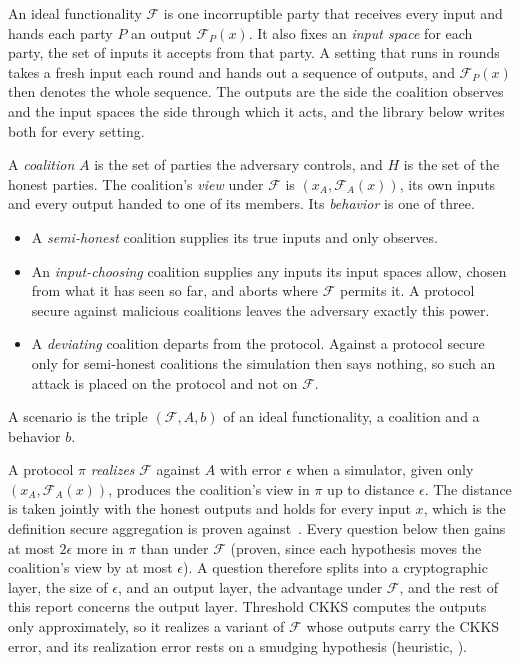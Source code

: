 \documentclass{labreport}
\newcommand{\IF}{\mathcal{F}}
\begin{document}
An ideal functionality $\IF$ is one incorruptible party that receives every input and hands each party $P$ an output $\IF_P(x)$.
It also fixes an \emph{input space} for each party, the set of inputs it accepts from that party.
A setting that runs in rounds takes a fresh input each round and hands out a sequence of outputs, and $\IF_P(x)$ then denotes the whole sequence.
The outputs are the side the coalition observes and the input spaces the side through which it acts, and the library below writes both for every setting.

A \emph{coalition} $A$ is the set of parties the adversary controls, and $H$ is the set of the honest parties.
The coalition's \emph{view} under $\IF$ is $(x_A,\IF_A(x))$, its own inputs and every output handed to one of its members.
Its \emph{behavior} is one of three.
\begin{itemize}
  \item A \emph{semi-honest} coalition supplies its true inputs and only observes.
  \item An \emph{input-choosing} coalition supplies any inputs its input spaces allow, chosen from what it has seen so far, and aborts where $\IF$ permits it. A protocol secure against malicious coalitions leaves the adversary exactly this power.
  \item A \emph{deviating} coalition departs from the protocol. Against a protocol secure only for semi-honest coalitions the simulation then says nothing, so such an attack is placed on the protocol and not on $\IF$.
\end{itemize}
A scenario is the triple $(\IF,A,b)$ of an ideal functionality, a coalition and a behavior $b$.

A protocol $\pi$ \emph{realizes} $\IF$ against $A$ with error $\epsilon$ when a simulator, given only $(x_A,\IF_A(x))$, produces the coalition's view in $\pi$ up to distance $\epsilon$.
The distance is taken jointly with the honest outputs and holds for every input $x$, which is the definition secure aggregation is proven against~\cite{MOJC23,MWAPR23}.
Every question below then gains at most $2\epsilon$ more in $\pi$ than under $\IF$ (proven, since each hypothesis moves the coalition's view by at most $\epsilon$).
A question therefore splits into a cryptographic layer, the size of $\epsilon$, and an output layer, the advantage under $\IF$, and the rest of this report concerns the output layer.
Threshold CKKS computes the outputs only approximately, so it realizes a variant of $\IF$ whose outputs carry the CKKS error, and its realization error rests on a smudging hypothesis (heuristic, ).
\end{document}

